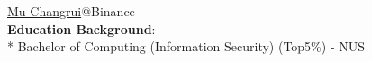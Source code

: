\documentclass[a0,portrait]{a0poster}
\begin{document}
\begin{minipage}[b][][t]{.6\linewidth}
\vfill
\makeatletter
\raggedright{\fontsize{92pt}{100pt}\selectfont\color{binanceyellow}\textbf{{\@title}}\par}
\makeatother
\color{Black}
\vspace{1cm}
\LARGE\underline{Mu Changrui}@Binance\\
\vspace{0.2cm}
\large \textbf{Education Background}:\\
\large
* Bachelor of Computing (Information Security) (Top5\%) 	 - NUS
\end{minipage}%
%
\begin{minipage}[b][][t]{0.39\linewidth}
\vfill
\end{minipage}
\vspace{0cm}

\end{document}

